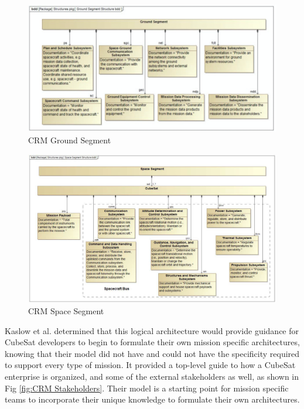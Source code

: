 \begin{figure}[H]
    \centering
    \includegraphics[width=\textwidth]{Thesis/Literature_Review/Lit Review Figures/CubeSat Ground Segment.png}
    \caption{CRM Ground Segment}
    \label{fig:CRM Ground Segment}
\end{figure}

\begin{figure}[H]
    \centering
    \includegraphics[width=\textwidth]{Thesis/Literature_Review/Lit Review Figures/CubeSat RA Space Segment.png}
    \caption{CRM Space Segment}
    \label{fig:CRM Space Segment}
\end{figure}

Kaslow et al. determined that this logical architecture would provide guidance for CubeSat developers to begin to formulate their own mission specific architectures, knowing that their model did not have and could not have the specificity required to support every type of mission. It provided a top-level guide to how a CubeSat enterprise is organized, and some of the external stakeholders as well, as shown in Fig \ref{fig:CRM Stakeholders}. Their model is a starting point for mission specific teams to incorporate their unique knowledge to formulate their own architectures.

